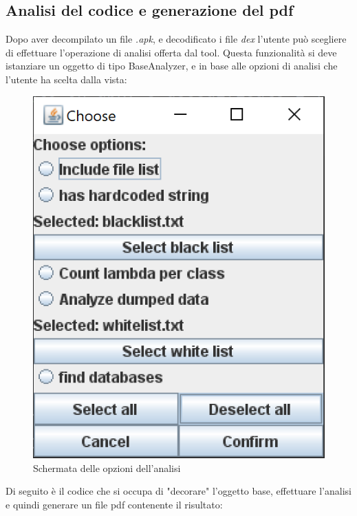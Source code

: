 \subsection{Analisi del codice e generazione del pdf}\label{subsec:analisi-del-codice-e-generazione-del-pdf}
Dopo aver decompilato un file \textit{.apk}, e decodificato i file \textit{dex} l'utente può scegliere di effettuare l'operazione di analisi offerta dal tool.
Questa funzionalità si deve istanziare un oggetto di tipo BaseAnalyzer, e in base alle opzioni di analisi che l'utente ha scelta dalla vista:
\begin{figure}[H]
    \centering
    \includegraphics{./immagini/tool/analysis_chooser.png}
    \caption{Schermata delle opzioni dell'analisi}\label{fig:analysis_chooser}
\end{figure}
Di seguito è il codice che si occupa di "decorare" l'oggetto base, effettuare l'analisi e quindi generare un file pdf contenente il risultato:

